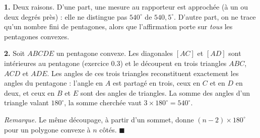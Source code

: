 \textbf{1.} Deux raisons. D'une part, une mesure au rapporteur est
approchée (à un ou deux degrés près) : elle ne distingue pas $540^\circ$ de
$540{,}5^\circ$. D'autre part, on ne trace qu'un nombre fini de pentagones,
alors que l'affirmation porte sur \emph{tous} les pentagones convexes.

\textbf{2.} Soit $ABCDE$ un pentagone convexe. Les diagonales $[AC]$ et $[AD]$
sont intérieures au pentagone (exercice 0.3) et le découpent en trois
triangles $ABC$, $ACD$ et $ADE$. Les angles de ces trois triangles
reconstituent exactement les angles du pentagone : l'angle en $A$ est
partagé en trois, ceux en $C$ et en $D$ en deux, et ceux en $B$ et $E$ sont
des angles de triangles. La somme des angles d'un triangle valant
$180^\circ$, la somme cherchée vaut $3 \times 180^\circ = 540^\circ$.

\emph{Remarque.} Le même découpage, à partir d'un sommet, donne
$(n - 2) \times 180^\circ$ pour un polygone convexe à $n$ côtés.
\hfill $\blacksquare$
